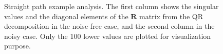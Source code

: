 \begin{figure}[t]
\begin{minipage}{.492\columnwidth}
\end{minipage}
\caption{Straight path example analysis. The first column shows the singular
  values and the diagonal elements of the $\mathbf{R}$ matrix from the QR
  decomposition in the noise-free case, and the second column in the noisy
  case. Only the 100 lower values are plotted for visualization purpose.}
\label{fig:straight-path-analysis}
\end{figure}









